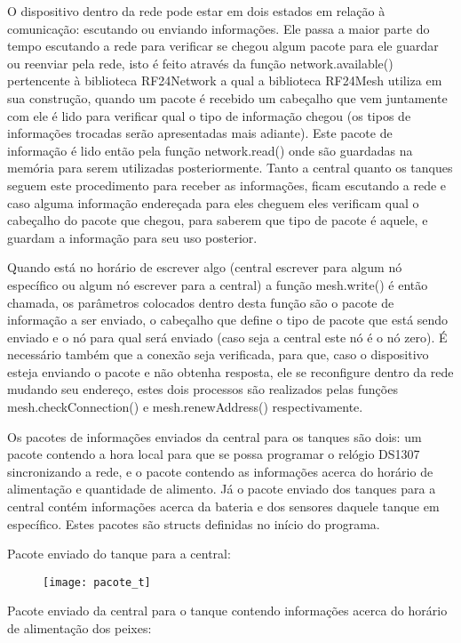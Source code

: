 O dispositivo dentro da rede pode estar em dois estados em relação à comunicação: escutando ou enviando informações. Ele passa a maior parte do tempo escutando a rede para verificar se chegou algum pacote para ele guardar ou reenviar pela rede, isto é feito através da função network.available() pertencente à biblioteca RF24Network a qual a biblioteca RF24Mesh utiliza em sua construção, quando um pacote é recebido um cabeçalho que vem juntamente com ele é lido para verificar qual o tipo de informação chegou (os tipos de informações trocadas serão apresentadas mais adiante). Este pacote de informação é lido então pela função network.read() onde são guardadas na memória para serem utilizadas posteriormente. Tanto a central quanto os tanques seguem este procedimento para receber as informações, ficam escutando a rede e caso alguma informação endereçada para eles cheguem eles verificam qual o cabeçalho do pacote que chegou, para saberem que tipo de pacote é aquele, e guardam a informação para seu uso posterior.

Quando está no horário de escrever algo (central escrever para algum nó específico ou algum nó escrever para a central) a função mesh.write() é então chamada, os parâmetros colocados dentro desta função são o pacote de informação a ser enviado, o cabeçalho que define o tipo de pacote que está sendo enviado e o nó para qual será enviado (caso seja a central este nó é o nó zero). É necessário também que a conexão seja verificada, para que, caso o dispositivo esteja enviando o pacote e não obtenha resposta, ele se reconfigure dentro da rede mudando seu endereço, estes dois processos são realizados pelas funções mesh.checkConnection() e mesh.renewAddress() respectivamente.

Os pacotes de informações enviados da central para os tanques são dois: um pacote contendo a hora local para que se possa programar o relógio DS1307 sincronizando a rede, e o pacote contendo as informações acerca do horário de alimentação e quantidade de alimento. Já o pacote enviado dos tanques para a central contém informações acerca da bateria e dos sensores daquele tanque em específico. Estes pacotes são structs definidas no início do programa.

Pacote enviado do tanque para a central:

\begin{figure}[!h]
\centering \texttt{[image: pacote\_t]}
\label{pacote_t}
\end{figure}

Pacote enviado da central para o tanque contendo informações acerca do horário de alimentação dos peixes:

